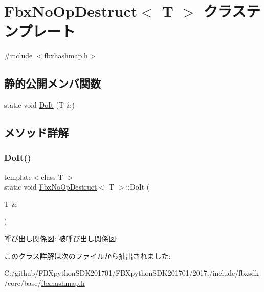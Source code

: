 \hypertarget{class_fbx_no_op_destruct}{}\section{Fbx\+No\+Op\+Destruct$<$ T $>$ クラステンプレート}
\label{class_fbx_no_op_destruct}


{\ttfamily \#include $<$fbxhashmap.\+h$>$}

\subsection*{静的公開メンバ関数}
\begin{DoxyCompactItemize}
\item 
static void \hyperlink{class_fbx_no_op_destruct_a7ec896ae67c8bbd02a6147b8936a55fe}{Do\+It} (T \&)
\end{DoxyCompactItemize}


\subsection{メソッド詳解}
\mbox{\label{class_fbx_no_op_destruct_a7ec896ae67c8bbd02a6147b8936a55fe}} 
\subsubsection{\texorpdfstring{Do\+It()}{DoIt()}}
{\footnotesize\ttfamily template$<$class T $>$ \\
static void \hyperlink{class_fbx_no_op_destruct}{Fbx\+No\+Op\+Destruct}$<$ T $>$\+::Do\+It (\begin{DoxyParamCaption}\item[{T \&}]{ }\end{DoxyParamCaption})\hspace{0.3cm}{\ttfamily [static]}}

呼び出し関係図\+:
被呼び出し関係図\+:


このクラス詳解は次のファイルから抽出されました\+:\begin{DoxyCompactItemize}
\item 
C\+:/github/\+F\+B\+Xpython\+S\+D\+K201701/\+F\+B\+Xpython\+S\+D\+K201701/2017./include/fbxsdk/core/base/\hyperlink{fbxhashmap_8h}{fbxhashmap.\+h}\end{DoxyCompactItemize}
